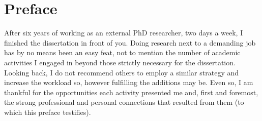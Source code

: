 


\section*{Preface}

After six years of working as an external PhD researcher, two days a week, I finished the dissertation in front of you. Doing research next to a demanding job has by no means been an easy feat, not to mention the number of academic activities I engaged in beyond those strictly necessary for the dissertation. 
Looking back, I do not recommend others to employ a similar strategy and %
increase the workload so, however fulfilling the additions may be. %
Even so, I am thankful for the opportunities each activity presented me and, first and foremost, the strong professional and personal connections that resulted from them (to which this preface testifies). %

